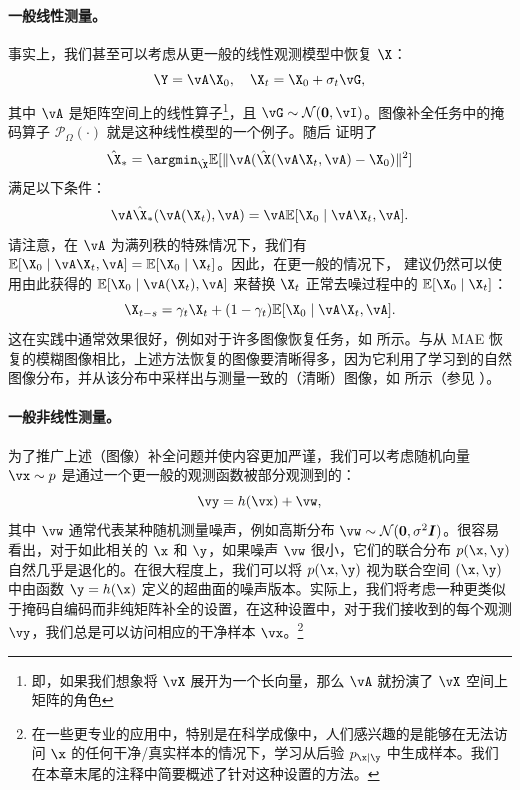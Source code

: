 \documentclass[../../book-main_zh.tex]{subfiles}
\begin{document}
\paragraph{一般线性测量。}
事实上，我们甚至可以考虑从更一般的线性观测模型中恢复 $\X$：
\begin{equation}
    \Y = \vA\X_0,  \quad \X_t = \X_0 + \sigma_t \vG,
\end{equation}
其中 $\vA$ 是矩阵空间上的线性算子\footnote{即，如果我们想象将 \(\vX\) 展开为一个长向量，那么 \(\vA\) 就扮演了 \(\vX\) 空间上矩阵的角色}，且 $\vG \sim \mathcal{N}(\boldsymbol{0}, \vI)$。图像补全任务中的掩码算子 $\mathcal{P}_{\Omega}(\cdot)$ 就是这种线性模型的一个例子。随后 \cite{daras2023ambient} 证明了
\begin{equation}
    \hat{\X}_* = \argmin_{\hat{\X}}
    \mathbb{E}[\|\vA(\hat{\X}(\vA\X_t, \vA) - \X_0)\|^2]
\end{equation}
满足以下条件：
\begin{equation}
    \vA \hat{\X}_*(\vA(\X_t), \vA) = \vA \mathbb{E}[\X_0 \mid \vA \X_t, \vA].
\end{equation} 请注意，在 $\vA$ 为满列秩的特殊情况下，我们有 $ \mathbb{E}[\X_0 \mid \vA\X_t, \vA] = \mathbb{E}[\X_0 \mid \X_t]$。因此，在更一般的情况下，\cite{daras2023ambient} 建议仍然可以使用由此获得的 $\mathbb{E}[\X_0 \mid \vA(\X_t), \vA]$ 来替换 $\X_t$ 正常去噪过程中的 $\mathbb{E}[\X_0 \mid \X_t]$：
\begin{equation}
    \X_{t-s} = \gamma_t \X_t + (1-\gamma_t) \mathbb{E}[\X_0 \mid \vA\X_t, \vA].
\end{equation}
这在实践中通常效果很好，例如对于许多图像恢复任务，如 \cite{daras2023ambient} 所示。与从 MAE 恢复的模糊图像相比，上述方法恢复的图像要清晰得多，因为它利用了学习到的自然图像分布，并从该分布中采样出与测量一致的（清晰）图像，如  所示（参见 ）。

\paragraph{一般非线性测量。}
为了推广上述（图像）补全问题并使内容更加严谨，我们可以考虑随机向量 $\vx \sim p$ 是通过一个更一般的观测函数被部分观测到的：
\begin{equation}\label{eq:measurement-matching-observation}
    \vy = h(\vx) + \vw,
\end{equation}
其中 $\vw$ 通常代表某种随机测量噪声，例如高斯分布 $\vw \sim \mathcal{N}(\mathbf{0}, \sigma^2 \boldsymbol{I})$。很容易看出，对于如此相关的 $\x$ 和 $\y$，如果噪声 $\vw$ 很小，它们的联合分布 $p(\x, \y)$ 自然几乎是退化的。在很大程度上，我们可以将 $p(\x, \y)$ 视为联合空间 $(\x, \y)$ 中由函数 $\y = h(\x)$ 定义的超曲面的噪声版本。实际上，我们将考虑一种更类似于掩码自编码而非纯矩阵补全的设置，在这种设置中，对于我们接收到的每个观测 $\vy$，我们总是可以访问相应的干净样本 $\vx$。\footnote{在一些更专业的应用中，特别是在科学成像中，人们感兴趣的是能够在无法访问 $\x$ 的任何干净/真实样本的情况下，学习从后验 $p_{\x \mid \y}$ 中生成样本。我们在本章末尾的注释中简要概述了针对这种设置的方法。}
\end{document}
